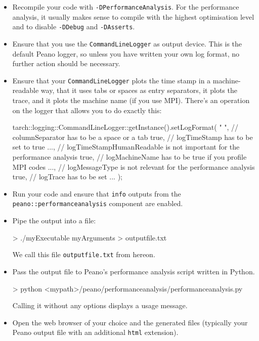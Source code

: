 \begin{itemize}
  \item Recompile your code with \texttt{-DPerformanceAnalysis}. For the
    performance analysis, it usually makes sense to compile with the highest
    optimisation level and to disable \texttt{-DDebug} and \texttt{-DAsserts}.
  \item Ensure that  you use the \texttt{CommandLineLogger} as output device.
    This is the default Peano logger, so unless you have written your own log
    format, no further action should be necessary.
  \item Ensure that your \texttt{CommandLineLogger} plots the time stamp in a
    machine-readable way, that it uses tabs or spaces as entry separators, it
    plots the trace, and it plots the machine name (if you use MPI). There's an operation on the logger that allows you to do
    exactly this:
    \begin{code}
tarch::logging::CommandLineLogger::getInstance().setLogFormat(
  " ",    // columnSeparator has to be a space or a tab
  true,   // logTimeStamp has to be set to true
  ...,    // logTimeStampHumanReadable is not important for the performance analysis
  true,   // logMachineName has to be true if you profile MPI codes
  ...,    // logMessageType is not relevant for the performance analysis 
  true,   // logTrace has to be set
  ...
);
    \end{code} 
  \item Run your code and ensure that \texttt{info} outputs from the
    \texttt{peano::performanceanalysis} component are enabled.
  \item Pipe the output into a file:
    \begin{code}
> ./myExecutable myArguments > outputfile.txt
    \end{code} 
    We call this file \texttt{outputfile.txt} from hereon.
  \item Pass the output file to Peano's performance analysis script written in
  Python. 
    \begin{code}
> python <mypath>/peano/performanceanalysis/performanceanalysis.py 
    \end{code} 
    Calling it without any options displays a usage message.
  \item Open the web browser of your choice and the generated files (typically
  your Peano output file with an additional \texttt{html} extension).
\end{itemize}

